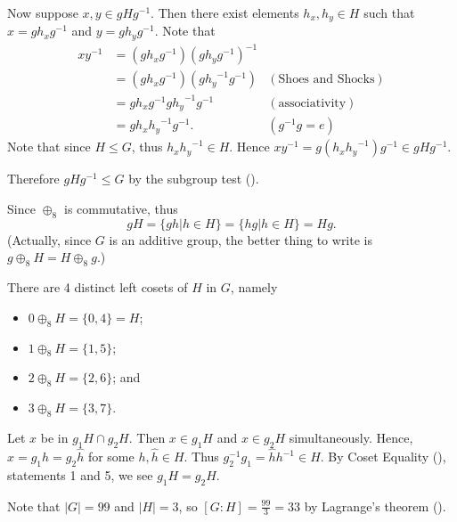\begin{questions}
    Now suppose $x, y \in gHg^{-1}$. Then there exist elements $h_x, h_y \in H$ such that $x = gh_xg^{-1}$ and $y = gh_yg^{-1}$. Note that
    \begin{align*}
        xy^{-1} &= (gh_xg^{-1})(gh_yg^{-1})^{-1}\\
        &= (gh_xg^{-1})(g{h_y}^{-1}g^{-1}) & (\text{Shoes and Shocks})\\
        &= gh_xg^{-1}g{h_y}^{-1}g^{-1} & (\text{associativity})\\
        &= gh_x{h_y}^{-1}g^{-1}. & (g^{-1}g = e)
    \end{align*}
    Note that since $H \leq G$, thus $h_x{h_y}^{-1} \in H$. Hence $xy^{-1} = g(h_x{h_y}^{-1})g^{-1} \in gHg^{-1}$.

    Therefore $gHg^{-1} \leq G$ by the subgroup test ().

    \item \begin{partquestions}{\alph*}
        \item Since $\oplus_8$ is commutative, thus
        \[
            gH = \{gh \vert h \in H\} = \{hg \vert h \in H\} = Hg.
        \]
        (Actually, since $G$ is an additive group, the better thing to write is $g \oplus_8 H = H \oplus_8 g$.)

        \item There are 4 distinct left cosets of $H$ in $G$, namely
        \begin{itemize}
            \item $0 \oplus_8 H = \{0, 4\} = H$;
            \item $1 \oplus_8 H = \{1, 5\}$;
            \item $2 \oplus_8 H = \{2, 6\}$; and
            \item $3 \oplus_8 H = \{3, 7\}$.
        \end{itemize}
    \end{partquestions}

    \item Let $x$ be in $g_1H \cap g_2H$. Then $x \in g_1H$ and $x \in g_2H$ simultaneously. Hence, $x = g_1h = g_2\hat{h}$ for some $h, \hat{h} \in H$. Thus $g_2^{-1}g_1 = \hat{h}h^{-1} \in H$. By Coset Equality (), statements 1 and 5, we see $g_1H = g_2H$.

    \item Note that $|G| = 99$ and $|H| = 3$, so $[G:H] = \frac{99}{3} = 33$ by Lagrange's theorem ().


\end{questions}
